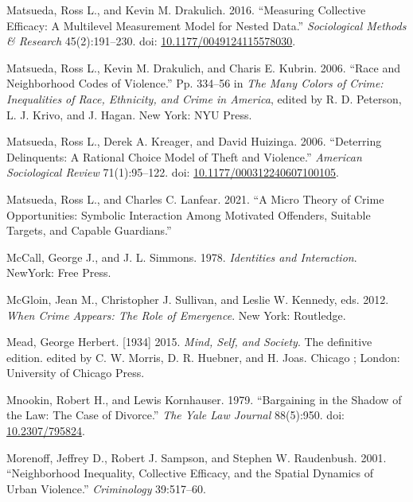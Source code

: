 \documentclass [11pt, proquest] {uwthesis}[2015/03/03]
\newlength{\cslhangindent}
\newenvironment{CSLReferences}[2]%
{\setlength{\parindent}{0pt}%
\everypar{\setlength{\hangindent}{\cslhangindent}}\ignorespaces}%
{\par}
\begin{document}
\begin{CSLReferences}{1}{0}
\leavevmode\hypertarget{ref-matsuedaMeasuringCollectiveEfficacy2016}{}%
Matsueda, Ross L., and Kevin M. Drakulich. 2016. {``Measuring {Collective Efficacy}: {A Multilevel Measurement Model} for {Nested Data}.''} \emph{Sociological Methods \& Research} 45(2):191--230. doi: \href{https://doi.org/10.1177/0049124115578030}{10.1177/0049124115578030}.

\leavevmode\hypertarget{ref-matsuedaRaceNeighborhoodCodes2006}{}%
Matsueda, Ross L., Kevin M. Drakulich, and Charis E. Kubrin. 2006. {``Race and {Neighborhood Codes} of {Violence}.''} Pp. 334--56 in \emph{The {Many Colors} of {Crime}: {Inequalities} of {Race}, {Ethnicity}, and {Crime} in {America}}, edited by R. D. Peterson, L. J. Krivo, and J. Hagan. {New York}: {NYU Press}.

\leavevmode\hypertarget{ref-matsuedaDeterringDelinquentsRational2006}{}%
Matsueda, Ross L., Derek A. Kreager, and David Huizinga. 2006. {``Deterring {Delinquents}: {A Rational Choice Model} of {Theft} and {Violence}.''} \emph{American Sociological Review} 71(1):95--122. doi: \href{https://doi.org/10.1177/000312240607100105}{10.1177/000312240607100105}.

\leavevmode\hypertarget{ref-matsuedaMicroTheoryCrime2021}{}%
Matsueda, Ross L., and Charles C. Lanfear. 2021. {``A {Micro Theory} of {Crime Opportunities}: {Symbolic Interaction} Among {Motivated Offenders}, {Suitable Targets}, and {Capable Guardians}.''}

\leavevmode\hypertarget{ref-mccallIdentitiesInteraction1978}{}%
McCall, George J., and J. L. Simmons. 1978. \emph{Identities and {Interaction}}. {NewYork}: {Free Press}.

\leavevmode\hypertarget{ref-mcgloinWhenCrimeAppears2012}{}%
McGloin, Jean M., Christopher J. Sullivan, and Leslie W. Kennedy, eds. 2012. \emph{When Crime Appears: The Role of Emergence}. {New York}: {Routledge}.

\leavevmode\hypertarget{ref-meadMindSelfSociety2015}{}%
Mead, George Herbert. {[}1934{]} 2015. \emph{Mind, Self, and Society}. The definitive edition. edited by C. W. Morris, D. R. Huebner, and H. Joas. {Chicago ; London}: {University of Chicago Press}.

\leavevmode\hypertarget{ref-mnookinBargainingShadowLaw1979}{}%
Mnookin, Robert H., and Lewis Kornhauser. 1979. {``Bargaining in the {Shadow} of the {Law}: {The Case} of {Divorce}.''} \emph{The Yale Law Journal} 88(5):950. doi: \href{https://doi.org/10.2307/795824}{10.2307/795824}.

\leavevmode\hypertarget{ref-morenoffNeighborhoodInequalityCollective2001}{}%
Morenoff, Jeffrey D., Robert J. Sampson, and Stephen W. Raudenbush. 2001. {``Neighborhood {Inequality}, {Collective Efficacy}, and the {Spatial Dynamics} of {Urban Violence}.''} \emph{Criminology} 39:517--60.


\end{CSLReferences}
\end{document}
